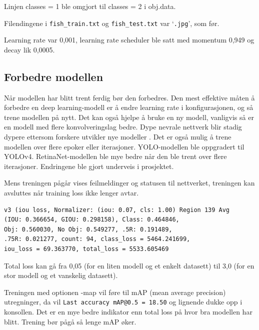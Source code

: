 Linjen classes = 1 ble omgjort til classes = 2 i obj.data. 

Filendingene i \texttt{fish\_train.txt} og \texttt{fish\_test.txt} var `\texttt{.jpg}', som før.

Learning rate var 0,001, learning rate scheduler ble satt med momentum 0,949 og decay lik 0,0005.

\subsection{Forbedre modellen}

Når modellen har blitt trent ferdig bør den forbedres. Den mest effektive måten å forbedre en deep learning-modell er å endre learning rate i konfigurasjonen, og så trene modellen på nytt. Det kan også hjelpe å bruke en ny modell, vanligvis så er en modell med flere konvolveringslag bedre. Dype nevrale nettverk blir stadig dypere ettersom forskere utvikler nye modeller \cite{Szegedy m.fl. s. 1}. Det er også mulig å trene modellen over flere epoker eller iterasjoner. YOLO-modellen ble oppgradert til YOLOv4. RetinaNet-modellen ble mye bedre når den ble trent over flere iterasjoner. Endringene ble gjort underveis i prosjektet. 

Mens treningen pågår vises feilmeldinger og statusen til nettverket, treningen kan avsluttes når training loss ikke lenger avtar. 

\begin{verbatim}
v3 (iou loss, Normalizer: (iou: 0.07, cls: 1.00) Region 139 Avg
(IOU: 0.366654, GIOU: 0.298158), Class: 0.464846,
Obj: 0.560030, No Obj: 0.549277, .5R: 0.191489,
.75R: 0.021277, count: 94, class_loss = 5464.241699,
iou_loss = 69.363770, total_loss = 5533.605469 
\end{verbatim}

Total loss kan gå fra 0,05 (for en liten modell og et enkelt datasett) til 3,0 (for en stor modell og et vanskelig datasett).

Treningen med optionen -map vil føre til mAP (mean average precision) utregninger, da vil \texttt{Last accuracy mAP@0.5 = 18.50} og lignende dukke opp i konsollen. Det er en mye bedre indikator enn total loss på hvor bra modellen har blitt. Trening bør pågå så lenge mAP øker.%

